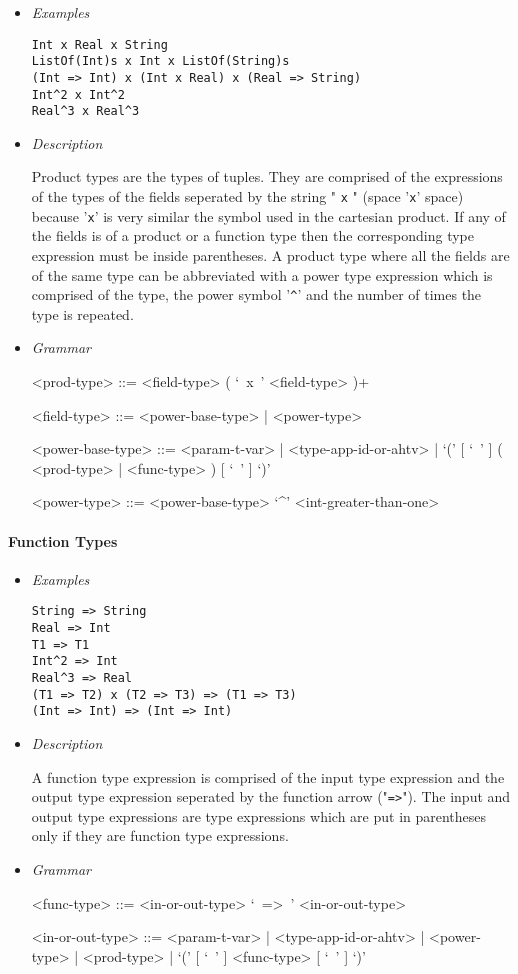 \documentclass{article}
\begin{document}
\begin{itemize}
\item \textit{Examples}
\begin{verbatim}
Int x Real x String
ListOf(Int)s x Int x ListOf(String)s
(Int => Int) x (Int x Real) x (Real => String)
Int^2 x Int^2
Real^3 x Real^3
\end{verbatim}

\item \textit{Description}

Product types are the types of tuples. They are comprised of the expressions of
the types of the fields seperated by the string " \verb|x| " (space '\verb|x|'
space) because '\verb|x|' is very similar the symbol used in the cartesian
product. If any of the fields is of a product or a function type then the
corresponding type expression must be inside parentheses. A product type where
all the fields are of the same type can be abbreviated with a power type
expression which is comprised of the type, the power symbol '\verb|^|' and the
number of times the type is repeated.

\item \textit{Grammar}
\begin{grammar}
<prod-type> ::= <field-type> ( `\ x\ ' <field-type> )+

<field-type> ::= <power-base-type> | <power-type>

<power-base-type> ::=
<param-t-var> | <type-app-id-or-ahtv> |
`(' [ `\ ' ] ( <prod-type> | <func-type> ) [ `\ ' ] `)'

<power-type> ::= <power-base-type> `^' <int-greater-than-one>
\end{grammar}
\end{itemize}

\paragraph{Function Types}

\begin{itemize}
\item \textit{Examples}
\begin{verbatim}
String => String
Real => Int
T1 => T1
Int^2 => Int
Real^3 => Real
(T1 => T2) x (T2 => T3) => (T1 => T3)
(Int => Int) => (Int => Int)
\end{verbatim}

\item \textit{Description}

A function type expression is comprised of the input type expression and the
output type expression seperated by the function arrow ("\verb|=>|"). The
input and output type expressions are type expressions which are put in
parentheses only if they are function type expressions.

\item \textit{Grammar}
\begin{grammar}
<func-type> ::= <in-or-out-type> `\ =>\ ' <in-or-out-type>

<in-or-out-type> ::=
<param-t-var> | <type-app-id-or-ahtv> | <power-type> | <prod-type> |
`(' [ `\ ' ] <func-type>  [ `\ ' ] `)'
\end{grammar}
\end{itemize}
\end{document}
